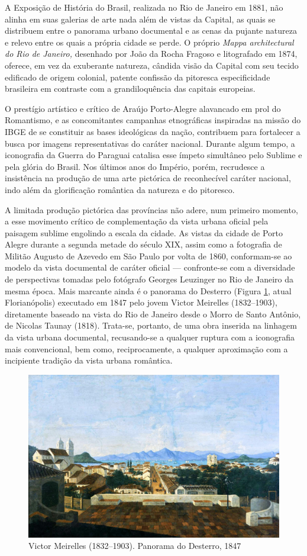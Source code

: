 A Exposição de História do Brasil, realizada no Rio de Janeiro em 1881,
não alinha em suas galerias de arte nada além de vistas da Capital, as
quais se distribuem entre o panorama urbano documental e as cenas da
pujante natureza e relevo entre os quais a própria cidade se perde. O
próprio \emph{Mappa architectural do Rio de Janeiro,} desenhado por João
da Rocha Fragoso e litografado em 1874, oferece, em vez da exuberante
natureza, cândida visão da Capital com seu tecido edificado de origem
colonial, patente confissão da pitoresca especificidade brasileira em
contraste com a grandiloquência das capitais europeias.

O prestígio artístico e crítico de Araújo Porto-Alegre alavancado em
prol do Romantismo, e as concomitantes campanhas etnográficas inspiradas
na missão do IBGE de se constituir as bases ideológicas da nação,
contribuem para fortalecer a busca por imagens representativas do
caráter nacional. Durante algum tempo, a iconografia da Guerra do
Paraguai catalisa esse ímpeto simultâneo pelo Sublime e pela glória do
Brasil. Nos últimos anos do Império, porém, recrudesce a insistência na
produção de uma arte pictórica de reconhecível caráter nacional, indo
além da glorificação romântica da natureza e do pitoresco.

A limitada produção pictórica das províncias não adere, num primeiro
momento, a esse movimento crítico de complementação da vista urbana
oficial pela paisagem sublime engolindo a escala da cidade. As vistas da
cidade de Porto Alegre durante a segunda metade do século XIX, assim
como a fotografia de Militão Augusto de Azevedo em São Paulo por volta
de 1860, conformam-se ao modelo da vista documental de caráter oficial
--- confronte-se com a diversidade de perspectivas tomadas pelo
fotógrafo Georges Leuzinger no Rio de Janeiro da mesma época. Mais
marcante ainda é o panorama do Desterro (Figura \ref{fig:desterro},
atual Florianópolis) executado em 1847 pelo jovem Victor Meirelles
(1832--1903), diretamente baseado na vista do Rio de Janeiro desde o
Morro de Santo Antônio, de Nicolas Taunay (1818). Trata-se, portanto, de
uma obra inserida na linhagem da vista urbana documental, recusando-se a
qualquer ruptura com a iconografia mais convencional, bem como,
reciprocamente, a qualquer aproximação com a incipiente tradição da
vista urbana romântica.

\begin{figure}
\hypertarget{fig:desterro}{%
\centering
\includegraphics{figures/Victor_Meirelles_-_Vista_do_Desterro_-_c._1847.jpg}
\caption{Victor Meirelles (1832--1903). Panorama do Desterro,
1847}\label{fig:desterro}
}
\end{figure}
